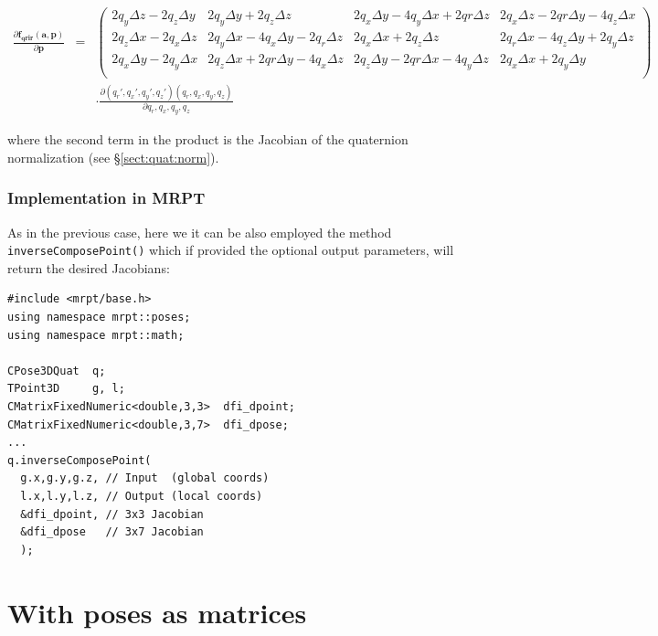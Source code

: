\documentclass[a4paper,11pt]{report}
\begin{document}
\begin{eqnarray}
\frac{ \partial \mathbf{f_{qrir}}( \mathbf{a}, \mathbf{p} )}{\partial \mathbf{p}} 
&=& 
\left(\begin{array}{cccc} 
2 q_y \Delta z - 2 q_z \Delta y &                  2 q_y \Delta y + 2 q_z \Delta z & 
2 q_x \Delta y - 4 q_y \Delta x + 2 qr \Delta z &  2 q_x \Delta z - 2 qr \Delta y - 4 q_z \Delta x 
\\
 2 q_z \Delta x - 2 q_x \Delta z &  2 q_y \Delta x - 4 q_x \Delta y - 2 q_r \Delta z &         
2 q_x \Delta x + 2 q_z \Delta z &  2 q_r \Delta x - 4 q_z \Delta y + 2 q_y \Delta z
\\
 2 q_x \Delta y - 2 q_y \Delta x &  2 q_z \Delta x + 2 qr \Delta y - 4 q_x \Delta z & 
2 q_z \Delta y - 2 qr \Delta x - 4 q_y \Delta z &  2 q_x \Delta x + 2 q_y \Delta y
\\
\end{array}\right) \nonumber \\
& ~ & \cdot \frac{\partial (q_r',q_x',q_y',q_z')(q_r,q_x,q_y,q_z)}{\partial q_r,q_x,q_y,q_z}  
\end{eqnarray}

\noindent where the second term in the product is the Jacobian of the quaternion 
normalization (see \S \ref{sect:quat:norm}).



\subsubsection{Implementation in MRPT}

As in the previous case, here we it can be also employed the method 
\texttt{inverseComposePoint()} which if provided the optional output parameters,
will return the desired Jacobians:

\begin{lstlisting}
#include <mrpt/base.h> 
using namespace mrpt::poses; 
using namespace mrpt::math; 

CPose3DQuat  q;
TPoint3D     g, l;
CMatrixFixedNumeric<double,3,3>  dfi_dpoint;
CMatrixFixedNumeric<double,3,7>  dfi_dpose;
...
q.inverseComposePoint(
  g.x,g.y,g.z, // Input  (global coords) 
  l.x,l.y,l.z, // Output (local coords)
  &dfi_dpoint, // 3x3 Jacobian
  &dfi_dpose   // 3x7 Jacobian
  );
\end{lstlisting}



\section{With poses as matrices}
\label{sect:inv_comp_mat}
\end{document}
